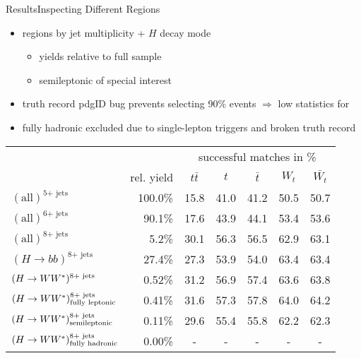 \documentclass[9pt, aspectratio=169]{beamer}
\begin{document}
\begin{frame}{Results}{Inspecting Different Regions}
	\begin{itemize}
		\item regions by jet multiplicity + $H$ decay mode
		\begin{itemize}
			\item yields relative to full sample 
			\item semileptonic \HWW of special interest
		\end{itemize}
		\item truth record pdgID bug prevents selecting 90\% events $\Rightarrow$ low statistics for \HWW
		\item fully hadronic \HWW excluded due to single-lepton triggers and broken truth record
	\end{itemize}

	\begin{table}
		\centering
		\begin{tabular}{l|r|c|c|c|c|c|}
			&&\multicolumn{5}{c|}{successful matches in \%}\\
			& rel. yield & $t\bar{t}$ & $t$ & $\bar{t}$ & $W_t$ & $\bar{W_t}$\\
			\hline
			$(\text{all})^{\text{5+ jets}}$  & 100.0\% & 15.8 & 41.0 & 41.2 & 50.5 & 50.7\\
			$(\text{all})^{\text{6+ jets}}$  & 90.1\% & 17.6 & 43.9 & 44.1 & 53.4 & 53.6\\
			$(\text{all})^{\text{8+ jets}}$  & 5.2\% & 30.1 & 56.3 & 56.5 & 62.9 & 63.1\\
			\hline
			$(H\rightarrow bb)^{\text{8+ jets}}$ & 27.4\% & 27.3 & 53.9 & 54.0 & 63.4 & 63.4\\
			$(\mbox{$H\rightarrow WW^*$})^{\text{8+ jets}}$ & 0.52\% & 31.2 & 56.9 & 57.4 & 63.6 & 63.8\\
			\hline
			$(\mbox{$H\rightarrow WW^*$})_{\text{fully leptonic}}^{\text{8+ jets}}$ & 0.41\% & 31.6 & 57.3 & 57.8 & 64.0 & 64.2\\
			\rowcolor{highlighter!40}
			$(\mbox{$H\rightarrow WW^*$})_{\text{semileptonic}}^{\text{8+ jets}}$ & 0.11\% & 29.6 & 55.4 & 55.8 & 62.2 & 62.3\\
			$(\mbox{$H\rightarrow WW^*$})_{\text{fully hadronic}}^{\text{8+ jets}}$ & 0.00\% & - & - & - & - & -\\
		\end{tabular}
	\end{table}
\end{frame}
\end{document}
